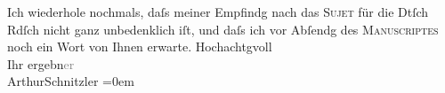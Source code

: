 \begin{ledgroupsized}[t]{13cm}
           \pstart
           Ich wiederhole nochmals, daſs meiner Empfindg nach das \textsc{Sujet} für die Dtſch Rdſch nicht ganz
                    unbedenklich iſt, und daſs ich vor Abſendg des \textsc{Manuscriptes} noch ein Wort von Ihnen erwarte.\pend
           \pstart
           Hochachtgvoll{\\[\baselineskip]} Ihr ergebn\textcolor{gray}{er}{\\[\baselineskip]}\spacefill\mbox{ArthurSchnitzler}\pend
           \leftskip=0em{}
         
         \endnumbering{}\end{ledgroupsized}  \newcommand{\dateiname}{L01048}\newcommand{\titel}{Arthur Schnitzler an Julius Rodenberg, 21. 6. 1900}\newcommand{\editorInnen}{Martin Anton Müller und Gerd-Hermann Susen}
      